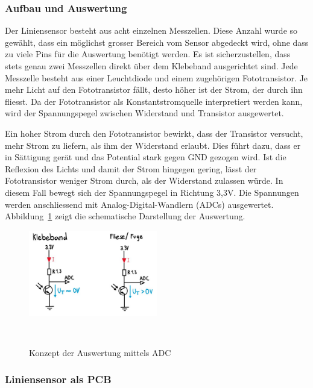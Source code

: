 \documentclass[main.tex]{subfiles} %
\begin{document}
\subsubsection*{Aufbau und Auswertung}
Der Liniensensor besteht aus acht einzelnen Messzellen. Diese Anzahl wurde so 
gewählt, dass ein möglichst grosser Bereich vom Sensor abgedeckt wird, ohne 
dass zu viele Pins für die Auswertung benötigt werden. Es ist sicherzustellen, 
dass stets genau zwei Messzellen direkt über dem Klebeband ausgerichtet sind. 
Jede Messzelle besteht aus einer Leuchtdiode und einem zugehörigen 
Fototransistor. Je mehr Licht auf den Fototransistor fällt, desto höher ist 
der Strom, der durch ihn fliesst. Da der Fototransistor als Konstantstromquelle 
interpretiert werden kann, wird der Spannungspegel zwischen Widerstand und 
Transistor ausgewertet.

Ein hoher Strom durch den Fototransistor bewirkt, dass der Transistor versucht, 
mehr Strom zu liefern, als ihm der Widerstand erlaubt. Dies führt dazu, dass er 
in Sättigung gerät und das Potential stark gegen GND gezogen wird. Ist die 
Reflexion des Lichts und damit der Strom hingegen gering, lässt der 
Fototransistor weniger Strom durch, als der Widerstand zulassen würde. In 
diesem Fall bewegt sich der Spannungspegel in Richtung 3,3V. Die Spannungen 
werden anschliessend mit Analog-Digital-Wandlern (ADCs) ausgewertet. 
Abbildung~\ref{fig:Auswertung_Liniensensor1} zeigt die schematische Darstellung 
der Auswertung.
\begin{figure}[H]
    \centering
    \includegraphics[width=0.5\textwidth]{fig_Strecke_Tracken/Auswertung_Liniensensor.pdf}
    \caption{Konzept der Auswertung mittels ADC}~\label{fig:Auswertung_Liniensensor1}
\end{figure}


\subsubsection{Liniensensor als PCB}
\end{document}
